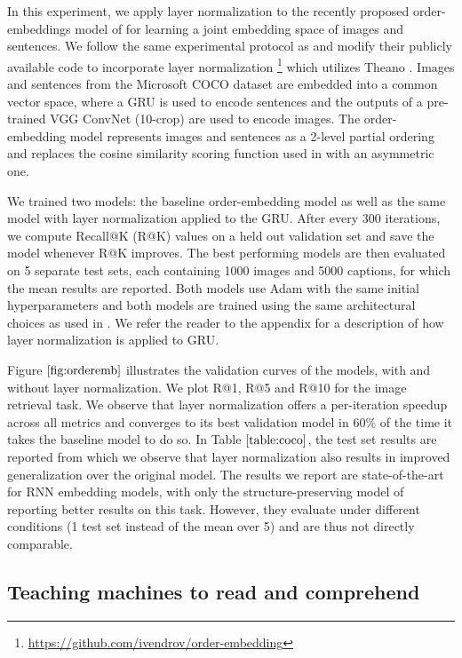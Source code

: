 \documentclass{article}
\begin{document}
In this experiment, we apply layer normalization to the recently proposed order-embeddings model of \citet{vendrov2015order} for learning a joint embedding space of images and sentences. We follow the same experimental protocol as \citet{vendrov2015order} and modify their publicly available code to incorporate layer normalization \footnote{\url{https://github.com/ivendrov/order-embedding}} which utilizes Theano \citep{team2016theano}. Images and sentences from the Microsoft COCO dataset \citep{lin2014microsoft} are embedded into a common vector space, where a GRU \citep{cho2014learning} is used to encode sentences and the outputs of a pre-trained VGG ConvNet \citep{simonyan2014very} (10-crop) are used to encode images. The order-embedding model represents images and sentences as a 2-level partial ordering and replaces the cosine similarity scoring function used in \citet{kiros2014unifying} with an asymmetric one.

We trained two models: the baseline order-embedding model as well as the same model with layer normalization applied to the GRU. After every 300 iterations, we compute Recall@K (R@K) values on a held out validation set and save the model whenever R@K improves. The best performing models are then evaluated on 5 separate test sets, each containing 1000 images and 5000 captions, for which the mean results are reported. Both models use Adam \citep{adam} with the same initial hyperparameters and both models are trained using the same architectural choices as used in \citet{vendrov2015order}. We refer the reader to the appendix for a description of how layer normalization is applied to GRU.

Figure $\ref{fig:orderemb}$ illustrates the validation curves of the models, with and without layer normalization. We plot R@1, R@5 and R@10 for the image retrieval task. We observe that layer normalization offers a per-iteration speedup across all metrics and converges to its best validation model in 60\% of the time it takes the baseline model to do so. In Table $\ref{table:coco}$, the test set results are reported from which we observe that layer normalization also results in improved generalization over the original model. The results we report are state-of-the-art for RNN embedding models, with only the structure-preserving model of \citet{wang2015learning} reporting better results on this task. However, they evaluate under different conditions (1 test set instead of the mean over 5) and are thus not directly comparable.

\subsection{Teaching machines to read and comprehend}
\end{document}
